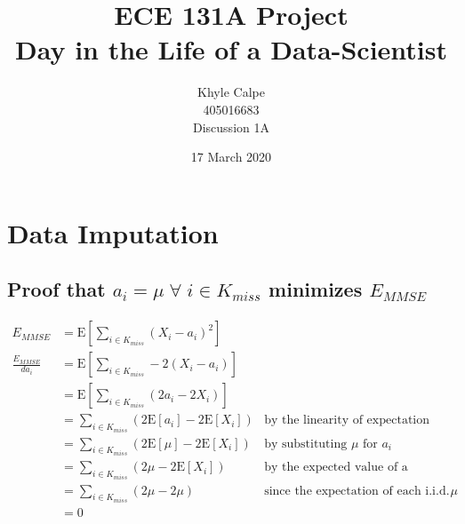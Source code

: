 \documentclass[12pt, a4paper, titlepage, fleqn]{article}
\title{ ECE 131A Project \\ Day in the Life of a Data-Scientist}
\author{Khyle Calpe \\ 405016683 \\ Discussion 1A}
\date{17 March 2020}
\begin{document}
\maketitle

\section{Data Imputation}

\subsection{Proof that $a_i = \mu \; \forall \; i \in K_{miss}$ minimizes $E_{MMSE}$}

\begin{align}
	E_{MMSE} &= \text{E}[ \sum_{i \in K_{miss}}(X_i - a_i)^2] \\
	\frac{E_{MMSE}}{da_i} &= \text{E}[ \sum_{i \in K_{miss}}-2(X_i - a_i)] \\
	&= \text{E}[ \sum_{i \in K_{miss}}(2a_i - 2X_i)] \\
	&= \sum_{i \in K_{miss}}(2\text{E}[a_i] - 2\text{E}[X_i]) &\text{by the linearity of expectation} \\
	&= \sum_{i \in K_{miss}}(2\text{E}[\mu] - 2\text{E}[X_i]) &\text{by substituting $\mu$ for $a_i$} \\
	&= \sum_{i \in K_{miss}}(2\mu - 2\text{E}[X_i]) &\text{by the expected value of a constant} \\
	&= \sum_{i \in K_{miss}}(2\mu - 2\mu) &\text{since the expectation of each i.i.d. RV is $\mu$} \\
	&= 0
\end{align}
\end{document}
